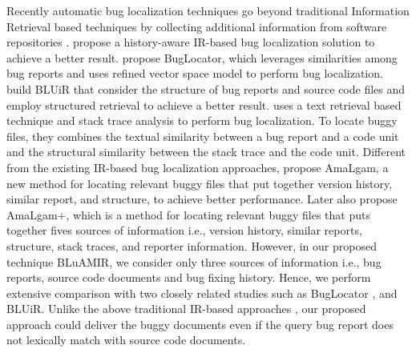 \documentclass[conference]{IEEEtran}
\begin{document}
Recently automatic bug localization techniques go beyond traditional
Information Retrieval based techniques by collecting additional information from software repositories \cite{Sisman, Jian, Saha, Moreno, Wang}.
\citet{Sisman} propose a history-aware IR-based bug localization solution to achieve a better
result. \citet{Jian} propose BugLocator, which leverages similarities among bug reports and uses refined vector space model to perform bug localization. \citet{Saha} build BLUiR that consider the structure of bug reports and source code files and employ structured retrieval to achieve a better result. \citet{Moreno} uses a text retrieval based technique and stack trace analysis to perform bug localization. To locate buggy files, they combines the textual similarity between a bug report and a code unit and the structural similarity between the stack trace and the code unit. Different from the existing IR-based bug localization approaches, \citet{Wang} propose AmaLgam, a new method for locating relevant buggy files that put together version history, similar report, and structure, to achieve better performance. Later \cite{Wang2} also propose AmaLgam+, which is a method for locating relevant buggy files that puts together fives sources of information i.e., version history, similar reports, structure, stack traces, and reporter information. 
However, in our proposed technique BLuAMIR, we consider only three sources of information i.e., bug reports, source code documents and bug fixing history. Hence, we perform extensive comparison with two closely related studies such as BugLocator \cite{Jian}, and BLUiR\cite{Saha}.
Unlike the above traditional IR-based approaches \cite{Sisman, Jian, Saha, Moreno, Wang, Wang2}, our proposed approach could deliver the buggy documents even if the query bug report does not lexically match with source code documents.
\end{document}
